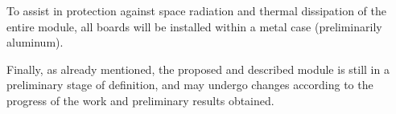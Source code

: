 
To assist in protection against space radiation and thermal dissipation of the entire module, all boards will be installed within a metal case (preliminarily aluminum).


Finally, as already mentioned, the proposed and described module is still in a preliminary stage of definition, and may undergo changes according to the progress of the work and preliminary results obtained.
